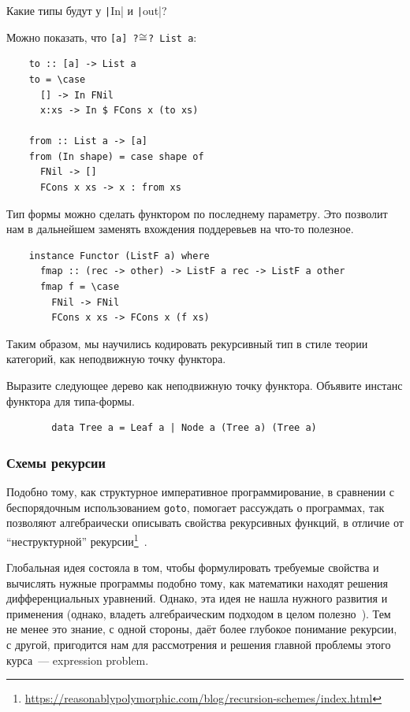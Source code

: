 \begin{task}
    Какие типы будут у \texttt|In| и \texttt|out|?
\end{task}

Можно показать, что \texttt{[a] ?$\cong$? List a}:
\begin{verbatim}
    to :: [a] -> List a
    to = \case
      [] -> In FNil
      x:xs -> In $ FCons x (to xs)

    from :: List a -> [a]
    from (In shape) = case shape of
      FNil -> []
      FCons x xs -> x : from xs
\end{verbatim}

Тип формы можно сделать функтором по последнему параметру.
Это позволит нам в дальнейшем заменять вхождения поддеревьев на что-то полезное.
\begin{verbatim}
    instance Functor (ListF a) where
      fmap :: (rec -> other) -> ListF a rec -> ListF a other
      fmap f = \case
        FNil -> FNil
        FCons x xs -> FCons x (f xs)
\end{verbatim}

Таким образом, мы научились кодировать рекурсивный тип в стиле теории категорий, как неподвижную точку функтора.

\begin{task}
    Выразите следующее дерево как неподвижную точку функтора.
    Объявите инстанс функтора для типа-формы.
    \begin{verbatim}
        data Tree a = Leaf a | Node a (Tree a) (Tree a)
    \end{verbatim}
\end{task}

\subsubsection{Схемы рекурсии} \label{subsubsec:recursion-schemas}

Подобно тому, как структурное императивное программирование, в сравнении с беспорядочным использованием \texttt{goto}, помогает рассуждать о программах, так  позволяют алгебраически описывать свойства рекурсивных функций, в отличие от ``неструктурной'' рекурсии\footnote{\url{https://reasonablypolymorphic.com/blog/recursion-schemes/index.html}}~\cite{meijer1991functional, meijer1995bananas}.

Глобальная идея состояла в том, чтобы формулировать требуемые свойства и вычислять нужные программы подобно тому, как математики находят решения дифференциальных уравнений.
Однако, эта идея не нашла нужного развития и применения (однако, владеть алгебраическим подходом в целом полезно~\cite{maguire-algebra}).
Тем не менее это знание, с одной стороны, даёт более глубокое понимание рекурсии, с другой, пригодится нам для рассмотрения и решения главной проблемы этого курса~--- expression problem.

